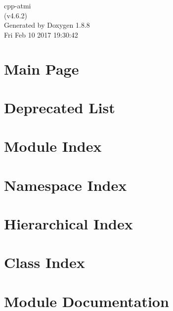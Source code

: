 \documentclass[twoside]{book}
\newcommand{\+}{\discretionary{\mbox{\scriptsize$\hookleftarrow$}}{}{}}
\newcommand{\clearemptydoublepage}{%
  \newpage{\pagestyle{empty}\cleardoublepage}%
}
\begin{document}
\hypersetup{pageanchor=false,
             bookmarks=true,
             bookmarksnumbered=true,
             pdfencoding=unicode
            }
\begin{titlepage}
\vspace*{7cm}
\begin{center}%
{\Large cpp-\/atmi \\[1ex]\large (v4.\+6.\+2) }\\
\vspace*{1cm}
{\large Generated by Doxygen 1.8.8}\\
\vspace*{0.5cm}
{\small Fri Feb 10 2017 19:30:42}\\
\end{center}
\end{titlepage}
\clearemptydoublepage
\tableofcontents
\clearemptydoublepage
{}
\hypersetup{pageanchor=true}

\chapter{Main Page}
\label{index}\hypertarget{index}{}
\chapter{Deprecated List}
\label{deprecated}
\hypertarget{deprecated}{}

\chapter{Module Index}

\chapter{Namespace Index}

\chapter{Hierarchical Index}

\chapter{Class Index}

\chapter{Module Documentation}





\end{document}
